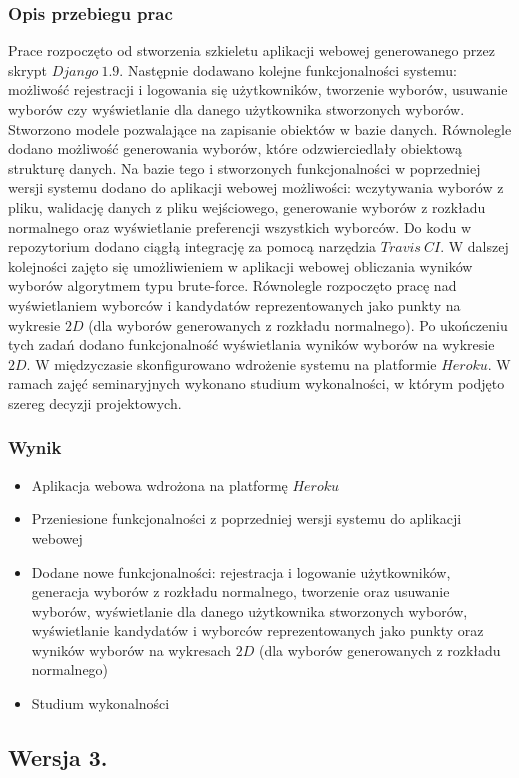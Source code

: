 \documentclass[pdflatex,11pt]{../aghdoc_version2}
\begin{document}
\subsubsection{Opis przebiegu prac}
Prace rozpoczęto od stworzenia szkieletu aplikacji webowej generowanego przez skrypt
$Django \ 1.9$. Następnie dodawano kolejne funkcjonalności systemu: możliwość rejestracji i
logowania się użytkowników, tworzenie wyborów, usuwanie wyborów czy wyświetlanie dla
danego użytkownika stworzonych wyborów. Stworzono modele pozwalające na zapisanie
obiektów w bazie danych. Równolegle dodano możliwość generowania wyborów, które
odzwierciedlały obiektową strukturę danych. Na bazie tego i stworzonych funkcjonalności w
poprzedniej wersji systemu dodano do aplikacji webowej możliwości: wczytywania wyborów
z pliku, walidację danych z pliku wejściowego, generowanie wyborów z rozkładu normalnego
oraz wyświetlanie preferencji wszystkich wyborców. Do kodu w repozytorium dodano ciągłą
integrację za pomocą narzędzia $Travis \ CI$. W dalszej kolejności zajęto się umożliwieniem w aplikacji webowej obliczania wyników wyborów algorytmem typu brute-force. Równolegle
rozpoczęto pracę nad wyświetlaniem wyborców i kandydatów reprezentowanych jako punkty
na wykresie $2D$ (dla wyborów generowanych z rozkładu normalnego). Po ukończeniu tych
zadań dodano funkcjonalność wyświetlania wyników wyborów na wykresie $2D$. W
międzyczasie skonfigurowano wdrożenie systemu na platformie $Heroku$. W ramach zajęć
seminaryjnych wykonano studium wykonalności, w którym podjęto szereg decyzji
projektowych.
\subsubsection{Wynik}
\begin{itemize}
\item Aplikacja webowa wdrożona na platformę $Heroku$
\item Przeniesione funkcjonalności z poprzedniej wersji systemu do aplikacji webowej
\item Dodane nowe funkcjonalności: rejestracja i logowanie użytkowników, generacja
wyborów z rozkładu normalnego, tworzenie oraz usuwanie wyborów, wyświetlanie
dla danego użytkownika stworzonych wyborów, wyświetlanie kandydatów i wyborców
reprezentowanych jako punkty oraz wyników wyborów na wykresach $2D$ (dla
wyborów generowanych z rozkładu normalnego)
\item Studium wykonalności
\end{itemize}

\subsection{Wersja 3.}
\end{document}
